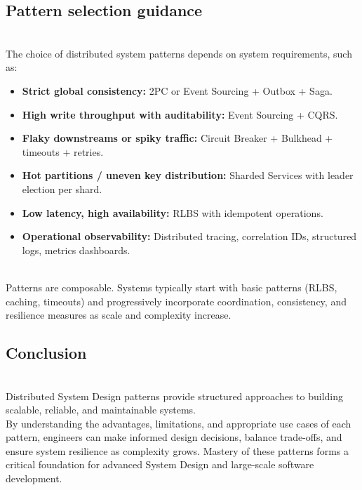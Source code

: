 \subsection{Pattern selection guidance}\label{AtUpzVhRxGq0es51mvdHc}
\\
The choice of distributed system patterns depends on system requirements, such as:

\begin{itemize}
\item
\protect{}\label{-Qll2Ab1WMFGAWjHjLu5C}
\textbf{Strict global consistency:} 2PC or Event Sourcing + Outbox + Saga.
\item
\protect{}\label{4XSZzLYpB2yWvQ52ROalW}
\textbf{High write throughput with auditability:} Event Sourcing + CQRS.
\item
\protect{}\label{HlCX8oqwH7ImjjhU-BjYM}
\textbf{Flaky downstreams or spiky traffic:} Circuit Breaker + Bulkhead + timeouts + retries.
\item
\protect{}\label{tga7XU-su3yGvj9qtnS6D}
\textbf{Hot partitions / uneven key distribution:} Sharded Services with leader election per shard.
\item
\protect{}\label{Mr_0yjinDLVnKOEp_9kYI}
\textbf{Low latency, high availability:} RLBS with idempotent operations.
\item
\protect{}\label{J14zS4wZ9RRJzKbY-K696}
\textbf{Operational observability:} Distributed tracing, correlation IDs, structured logs, metrics dashboards.
\end{itemize}
\\
Patterns are composable. Systems typically start with basic patterns (RLBS, caching, timeouts) and progressively incorporate coordination, consistency, and resilience measures as scale and complexity increase.

\subsection{Conclusion}\label{fygncGdZaQMeJtxAt7prt}
\\
Distributed System Design patterns provide structured approaches to building scalable, reliable, and maintainable systems.
\\
By understanding the advantages, limitations, and appropriate use cases of each pattern, engineers can make informed design decisions, balance trade-offs, and ensure system resilience as complexity grows. Mastery of these patterns forms a critical foundation for advanced System Design and large-scale software development.

